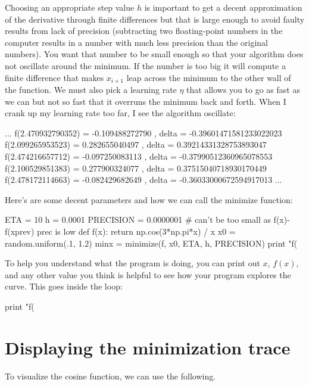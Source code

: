 \documentclass[titlepage]{tufte-book}
\begin{document}
\begin{fullwidth}
Choosing an appropriate step value $h$ is important to get a decent approximation of the derivative through finite differences but that is large enough to avoid faulty results from lack of precision (subtracting two floating-point numbers in the computer results in a number with much less precision than the original numbers). You want that number to be small enough so that your algorithm does not oscillate around the minimum. If the number is too big it will compute a finite difference that makes $x_{i+1}$ leap across the minimum to the other wall of the function.  We must also pick a learning rate $\eta$ that allows you to go as fast as we can but not so fast that it overruns the minimum back and forth. When I crank up my learning rate too far, I see the algorithm oscillate:

\begin{pyverbatim}
...
f(2.470932790352) = -0.109488272790 , delta = -0.39601471581233022023
f(2.099265953523) = 0.282655040497 , delta = 0.39214331328753893047
f(2.474216657712) = -0.097250083113 , delta = -0.37990512360965078553
f(2.100529851383) = 0.277900324077 , delta = 0.37515040718930170449
f(2.478172114663) = -0.082429682649 , delta = -0.36033000672594917013
...
\end{pyverbatim}

\noindent Here's are some decent parameters and how we can call the minimize function:

\begin{pyverbatim}
ETA = 10
h = 0.0001
PRECISION = 0.0000001 # can't be too small as f(x)-f(xprev) prec is low
def f(x): return np.cos(3*np.pi*x) / x
x0 = random.uniform(.1, 1.2)
minx = minimize(f, x0, ETA, h, PRECISION)
print "f(%
\end{pyverbatim}

To help you understand what the program is doing, you can print out $x$, $f(x)$, and any other value you think is helpful to see how your program explores the curve. This goes inside the loop:

\begin{pyverbatim}
print "f(%
\end{pyverbatim}

\section{Displaying the minimization trace}

To visualize the cosine function, we can use the following.


\end{fullwidth}
\end{document}
